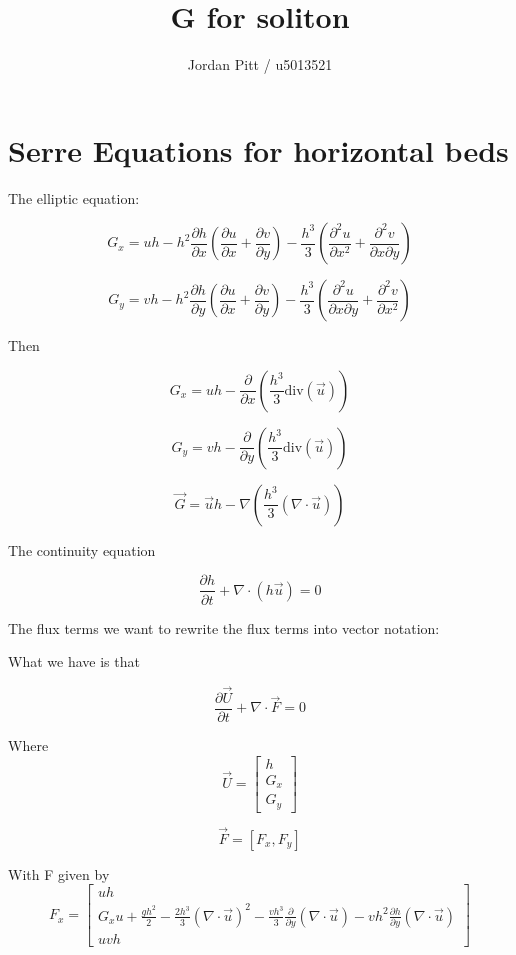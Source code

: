 \documentclass[12pt]{article}
\begin{document}
\title{G for soliton}
\author{Jordan Pitt / u5013521}

\section{Serre Equations for horizontal beds}

The elliptic equation:

\[G_x = uh - h^2\frac{\partial h}{\partial x}\left(\frac{\partial u}{\partial x} + \frac{\partial v}{\partial y}\right) - \frac{h^3}{3} \left(\frac{\partial ^2 u}{\partial x^2} + \frac{\partial ^2 v}{\partial x \partial y} \right)\]

\[G_y = vh - h^2\frac{\partial h}{\partial y}\left(\frac{\partial u}{\partial x} + \frac{\partial v}{\partial y}\right) - \frac{h^3}{3} \left(\frac{\partial ^2 u}{\partial x \partial y} + \frac{\partial ^2 v}{\partial x^2} \right)\]

Then

\[G_x = uh - \frac{\partial}{\partial x}\left(\frac{h^3}{3} \text{div}\left(\vec{u}\right)\right)\]

\[G_y = vh - \frac{\partial}{\partial y}\left(\frac{h^3}{3} \text{div}\left(\vec{u}\right)\right)\]

\[\vec{G} = \vec{u}h - \nabla\left(\frac{h^3}{3} \left(\nabla \cdot \vec{u} \right)\right)\]

The continuity equation

\[\frac{\partial h}{\partial t} + \nabla\cdot(h\vec{u}) = 0\]

The flux terms we want to rewrite the flux terms into vector notation: 

What we have is that

\[\frac{\partial \vec{U}}{\partial t} + \nabla \cdot \vec{F} = 0 \]

Where 
\[\vec{U} = \left[\begin{array}{c}
h \\
G_x \\
G_y
\end{array}\right]\]

\[\vec{F} = \left[F_x , F_y\right]\]

With F given by
\[F_x = \left[\begin{array}{c}
uh \\
G_xu + \frac{gh^2}{2} - \frac{2h^3}{3}\left(\nabla \cdot \vec{u}\right)^2 - \frac{vh^3}{3}\frac{\partial}{\partial y}\left(\nabla \cdot \vec{u}\right) - vh^2\frac{\partial h}{\partial y} \left(\nabla \cdot \vec{u}\right) \\
uvh
\end{array}\right] \]
\end{document}
